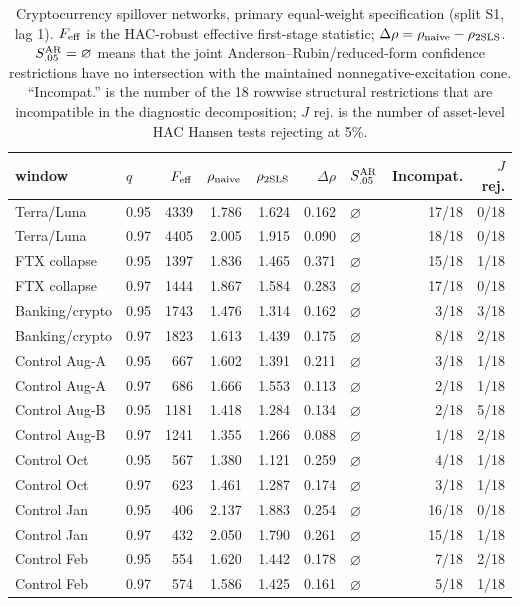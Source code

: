 \begin{table}[t]
\centering\small
\caption{Cryptocurrency spillover networks, primary equal-weight specification (split S1, lag 1). $F_{\rm eff}$ is the HAC-robust effective first-stage statistic; $\Delta\rho=\rho_{\rm naive}-\rho_{\rm 2SLS}$. $S^{\rm AR}_{.05}=\varnothing$ means that the joint Anderson--Rubin/reduced-form confidence restrictions have no intersection with the maintained nonnegative-excitation cone. ``Incompat.'' is the number of the 18 rowwise structural restrictions that are incompatible in the diagnostic decomposition; $J$ rej. is the number of asset-level HAC Hansen tests rejecting at 5\%.}
\label{tab:app}
\begin{tabular}{llrrrrlrr}
\toprule
window & $q$ & $F_{\rm eff}$ & $\rho_{\rm naive}$ & $\rho_{\rm 2SLS}$ & $\Delta\rho$ & $S^{\rm AR}_{.05}$ & Incompat. & $J$ rej.\\
\midrule
Terra/Luna & 0.95 & 4339 & 1.786 & 1.624 & 0.162 & $\varnothing$ & 17/18 & 0/18 \\
Terra/Luna & 0.97 & 4405 & 2.005 & 1.915 & 0.090 & $\varnothing$ & 18/18 & 0/18 \\
FTX collapse & 0.95 & 1397 & 1.836 & 1.465 & 0.371 & $\varnothing$ & 15/18 & 1/18 \\
FTX collapse & 0.97 & 1444 & 1.867 & 1.584 & 0.283 & $\varnothing$ & 17/18 & 0/18 \\
Banking/crypto & 0.95 & 1743 & 1.476 & 1.314 & 0.162 & $\varnothing$ & 3/18 & 3/18 \\
Banking/crypto & 0.97 & 1823 & 1.613 & 1.439 & 0.175 & $\varnothing$ & 8/18 & 2/18 \\
Control Aug-A & 0.95 & 667 & 1.602 & 1.391 & 0.211 & $\varnothing$ & 3/18 & 1/18 \\
Control Aug-A & 0.97 & 686 & 1.666 & 1.553 & 0.113 & $\varnothing$ & 2/18 & 1/18 \\
Control Aug-B & 0.95 & 1181 & 1.418 & 1.284 & 0.134 & $\varnothing$ & 2/18 & 5/18 \\
Control Aug-B & 0.97 & 1241 & 1.355 & 1.266 & 0.088 & $\varnothing$ & 1/18 & 2/18 \\
Control Oct & 0.95 & 567 & 1.380 & 1.121 & 0.259 & $\varnothing$ & 4/18 & 1/18 \\
Control Oct & 0.97 & 623 & 1.461 & 1.287 & 0.174 & $\varnothing$ & 3/18 & 1/18 \\
Control Jan & 0.95 & 406 & 2.137 & 1.883 & 0.254 & $\varnothing$ & 16/18 & 0/18 \\
Control Jan & 0.97 & 432 & 2.050 & 1.790 & 0.261 & $\varnothing$ & 15/18 & 1/18 \\
Control Feb & 0.95 & 554 & 1.620 & 1.442 & 0.178 & $\varnothing$ & 7/18 & 2/18 \\
Control Feb & 0.97 & 574 & 1.586 & 1.425 & 0.161 & $\varnothing$ & 5/18 & 1/18 \\
\bottomrule
\end{tabular}
\end{table}
